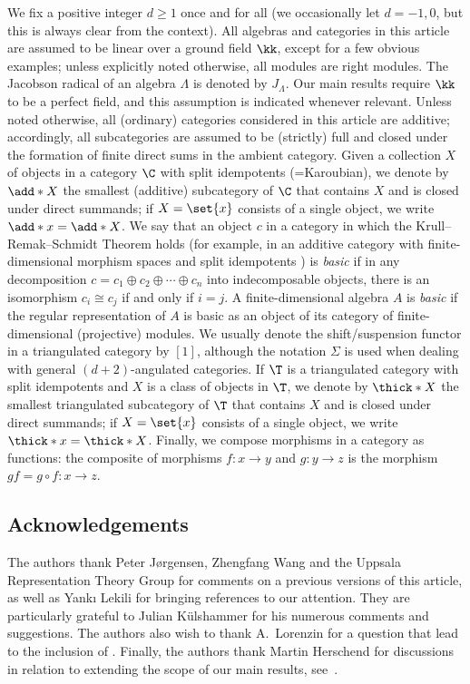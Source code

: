 \documentclass[a4paper]{amsart}
\begin{document}
We fix a positive integer $d\geq1$ once and for all (we occasionally let $d=-1,0$,
but this is always clear from the context). All algebras and categories in this
article are assumed to be linear over a ground field $\kk$, except for a few obvious examples; unless explicitly
noted otherwise, all modules are right modules. The Jacobson radical of an
algebra $\Lambda$ is denoted by $J_\Lambda$. Our main results require $\kk$ to
be a perfect field, and this assumption is indicated whenever relevant. Unless
noted otherwise, all (ordinary) categories considered in this article are
additive; accordingly, all subcategories are assumed to be (strictly) full and
closed under the formation of finite direct sums in the ambient category. Given
a collection $X$ of objects in a category $\C$ with split idempotents
(=Karoubian), we denote by $\add*{X}$ the smallest (additive) subcategory of
$\C$ that contains $X$ and is closed under direct summands; if $X=\set{x}$
consists of a single object, we write $\add*{x}=\add*{X}$. We say that an object
$c$ in a category in which the Krull--Remak--Schmidt Theorem holds (for example,
in an additive category with finite-dimensional morphism spaces and split
idempotents \cite[Cor.~4.4]{Kra15}) is \emph{basic} if in any decomposition
$c=c_1\oplus c_2\oplus\cdots\oplus c_n$ into indecomposable objects, there is an
isomorphism $c_i\cong c_j$ if and only if $i=j$. A finite-dimensional algebra
$A$ is \emph{basic} if the regular representation of $A$ is basic as an object
of its category of finite-dimensional (projective) modules. We usually denote
the shift/suspension functor in a triangulated category by $[1]$, although the
notation $\Sigma$ is used when dealing with general $(d+2)$-angulated
categories. If $\T$ is a triangulated category with split idempotents and $X$ is
a class of objects in $\T$, we denote by $\thick*{X}$ the smallest triangulated
subcategory of $\T$ that contains $X$ and is closed under direct summands; if
$X=\set{x}$ consists of a single object, we write $\thick*{x}=\thick*{X}$.
Finally, we compose morphisms in a category as functions: the composite of
morphisms $f\colon x\to y$ and $g\colon y\to z$ is the morphism $gf=g\circ
f\colon x\to z$.

\subsection*{Acknowledgements}

The authors thank Peter J{\o}rgensen, Zhengfang Wang and the Uppsala
Representation Theory Group for comments on a previous versions of
this article, as well as Yank{\i} Lekili for bringing references
\cite{Sei15,LP11} to our attention. They are particularly grateful to Julian
K{\"u}lshammer for his numerous
comments and suggestions. The authors also wish to thank A.~Lorenzin for a question that lead to the inclusion of
. Finally, the authors thank Martin Herschend for
discussions in relation to extending
the scope of our main results, see~.
\end{document}
